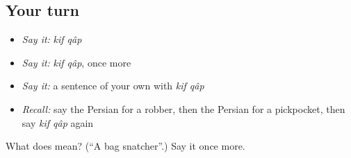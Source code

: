 \subsection*{Your turn}
\begin{itemize}
\raggedright
  \item \emph{Say it:} \emph{kif qâp}
  \item \emph{Say it:} \emph{kif qâp}, once more
  \item \emph{Say it:} a sentence of your own with \emph{kif qâp}
  \item \emph{Recall:} say the Persian for a robber, then the Persian for a pickpocket, then say \emph{kif qâp} again
\end{itemize}

\begin{tcolorbox}[breakable,colback=teal!4,colframe=teal!35!black,title={Before you move on}]
What does   mean? (\textquotedblleft{}A bag snatcher\textquotedblright{}.) Say it once more.
\end{tcolorbox}

